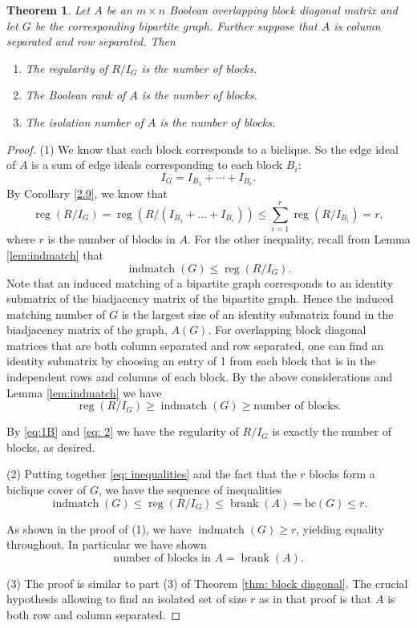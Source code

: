 \documentclass[11pt,letterpaper, reqno]{amsart}
\newtheorem{theorem}{Theorem}[section]
\theoremstyle{definition}
\theoremstyle{remark}
\DeclareMathOperator{\reg}{reg}
\DeclareMathOperator{\brank}{brank}
\DeclareMathOperator{\indmatch}{indmatch}
\numberwithin{equation}{section}
\begin{document}
\begin{theorem}
Let $A$ be an $m\times n$ Boolean overlapping block diagonal matrix and let  $G$ be the corresponding bipartite graph. Further suppose that $A$ is  column separated and row separated. Then \begin{enumerate}
    \item The regularity of $R/I_G$ is the number of blocks.
    \item The Boolean rank of $A$ is the number of blocks.
    \item The isolation number of $A$ is the number of blocks.
\end{enumerate}
\end{theorem}
\begin{proof}
(1) We know that each block corresponds to a biclique. So the edge ideal of $A$ is a sum of edge ideals corresponding to each block $B_i$:
\[
I_G=I_{B_1}+\cdots+I_{B_r}.
\]
By Corollary \ref{2.9}, we know that 
\begin{equation}\label{eq:1B}
\reg(R/I_G)= \reg(R/(I_{B_1}+\ldots + I_{B_r}))\leq \sum_{i=1}^r \reg (R/I_{B_i}) = r,
\end{equation}
where $r$ is the number of blocks in $A$.
For the other inequality, recall from Lemma \ref{lem:indmatch} that 
\[
\indmatch(G) \leq \reg(R/I_G).
\]
Note that an induced matching of a bipartite graph corresponds to an identity submatrix  of the biadjacency matrix of the bipartite graph. Hence the induced matching number of $G$ is the largest size of an identity submatrix found in the biadjacency matrix of the graph, $A(G)$. For overlapping block diagonal matrices that are both column separated and row separated, one can find an identity submatrix by choosing an entry of 1 from each block that is in the independent rows and columns of each block. By the above considerations and Lemma \ref{lem:indmatch} we have 
\begin{equation}\label{eq: 2}
 \reg(R/I_G) \geq \indmatch(G)  \geq \text{number of blocks}.
\end{equation}

By \eqref{eq:1B} and \eqref{eq: 2} we have the regularity of $R/I_G$ is exactly the number of blocks, as desired.

(2) 
Putting together \eqref{eq: inequalities} and the fact that the $r$ blocks form a biclique cover of $G$, we have the sequence of inequalities
\[
    \indmatch(G) \leq \reg(R/I_G) \leq  \brank(A) = \text{bc}(G)\leq r.
\]

As shown in the proof of (1), %
we have $\indmatch(G) \geq r$, yielding equality throughout.
In particular we have shown
\[
\text{number of blocks in $A$}=  \brank(A).
\]

(3) The proof is similar to part (3) of Theorem \ref{thm: block diagonal}. The crucial hypothesis allowing to find an isolated set of size $r$ as in that proof is that $A$ is both row and column separated.
\end{proof}
\end{document}
